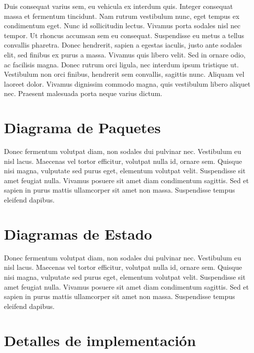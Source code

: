 \documentclass[titlepage,a4paper]{article}
\begin{document}
Duis consequat varius sem, eu vehicula ex interdum quis. Integer consequat massa et fermentum tincidunt. Nam rutrum vestibulum nunc, eget tempus ex condimentum eget. Nunc id sollicitudin lectus. Vivamus porta sodales nisl nec tempor. Ut rhoncus accumsan sem eu consequat. Suspendisse eu metus a tellus convallis pharetra. Donec hendrerit, sapien a egestas iaculis, justo ante sodales elit, sed finibus ex purus a massa. Vivamus quis libero velit. Sed in ornare odio, ac facilisis magna. Donec rutrum orci ligula, nec interdum ipsum tristique ut. Vestibulum non orci finibus, hendrerit sem convallis, sagittis nunc. Aliquam vel laoreet dolor. Vivamus dignissim commodo magna, quis vestibulum libero aliquet nec. Praesent malesuada porta neque varius dictum.

\section{Diagrama de Paquetes}\label{sec:diagramadepaquetes}

Donec fermentum volutpat diam, non sodales dui pulvinar nec. Vestibulum eu nisl lacus. Maecenas vel tortor efficitur, volutpat nulla id, ornare sem. Quisque nisi magna, vulputate sed purus eget, elementum volutpat velit. Suspendisse sit amet feugiat nulla. Vivamus posuere sit amet diam condimentum sagittis. Sed et sapien in purus mattis ullamcorper sit amet non massa. Suspendisse tempus eleifend dapibus.

\section{Diagramas de Estado}\label{sec:diagramasdeestado}

Donec fermentum volutpat diam, non sodales dui pulvinar nec. Vestibulum eu nisl lacus. Maecenas vel tortor efficitur, volutpat nulla id, ornare sem. Quisque nisi magna, vulputate sed purus eget, elementum volutpat velit. Suspendisse sit amet feugiat nulla. Vivamus posuere sit amet diam condimentum sagittis. Sed et sapien in purus mattis ullamcorper sit amet non massa. Suspendisse tempus eleifend dapibus.

\section{Detalles de implementación}\label{sec:implementacion}
\end{document}
